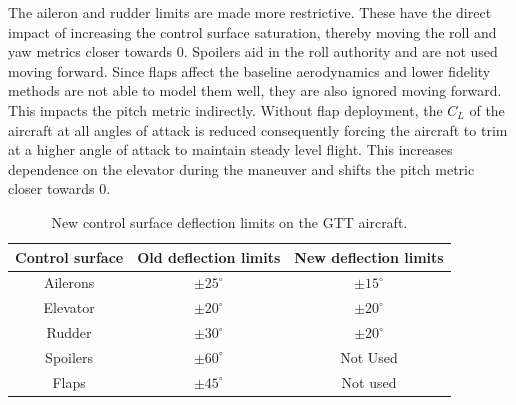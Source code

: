 The aileron and rudder limits are made more restrictive. 
These have the direct impact of increasing the control surface saturation, thereby moving the roll and yaw metrics closer towards $0$.
Spoilers aid in the roll authority and are not used moving forward.
Since flaps affect the baseline aerodynamics and lower fidelity methods are not able to model them well, they are also ignored moving forward. 
This impacts the pitch metric indirectly. 
Without flap deployment, the $C_L$ of the aircraft at all angles of attack is reduced consequently forcing the aircraft to trim at a higher angle of attack to maintain steady level flight. 
This increases dependence on the elevator during the maneuver and shifts the pitch metric closer towards $0$.

\begin{table}
\centering
    \renewcommand{\arraystretch}{1.2}
    \captionsetup{justification=centering}
    \caption{New control surface deflection limits on the GTT aircraft.} 
    \begin{tabular}{|c|c|c|}
    \hline
        Control surface & Old deflection limits & New deflection limits \\ \hline
        Ailerons & $\pm 25^\circ$ & $\pm 15^\circ$ \\ \hline
        Elevator & $\pm 20^\circ$ & $\pm 20^\circ$ \\ \hline
        Rudder & $\pm 30^\circ$ & $\pm 20^\circ$   \\ \hline
        Spoilers & $\pm 60^\circ$ & Not Used       \\ \hline
        Flaps & $\pm 45^\circ$ & Not used          \\ \hline
    \end{tabular}
    \label{tab:gtt_defl_limits_new}
\end{table}